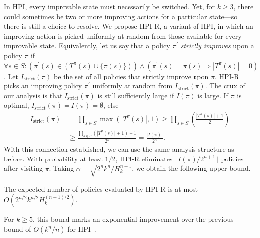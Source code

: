 In HPI, every improvable state must necessarily be switched. Yet, for $k \geq 3$, there could sometimes be two or more improving actions for a particular state---so there is still a choice to resolve. We propose HPI-R, a variant of HPI, in which an improving action is picked uniformly at random from those available for every improvable state. Equivalently, let us say that a policy $\pi^{\prime}$ \textit{strictly improves} upon a policy $\pi$ if $\forall s\in S: (\pi^{\prime}(s) \in (T^\pi(s) \cup \{\pi(s)\})) \wedge (\pi^{\prime}(s)=\pi(s)\Rightarrow |T^\pi(s)|=0)$. Let $I_{\text{strict}}(\pi)$ be the set of all policies that strictly improve upon $\pi$. HPI-R picks an improving policy $\pi^{\prime}$ uniformly at random from $I_{\text{strict}}(\pi)$. The crux of our analysis is that $I_{\text{strict}}(\pi)$ is still sufficiently large if $I(\pi)$ is large. If $\pi$ is optimal, $I_{\text{strict}}(\pi) = I(\pi) = \emptyset$, else
\begin{align*}
|I_{\text{strict}}(\pi)|
&= \prod_{s \in S} \max(|T^{\pi}(s)|, 1)
\geq
\prod_{s \in S} \left(\frac{|T^{\pi}(s)| + 1}{2}\right)\\
&\geq
\frac{\prod_{s \in S} (|T^{\pi}(s)| + 1) - 1}{2^{n}}
=  \frac{|I(\pi)|}{2^{n}}.
\end{align*}
With this connection established, we can use the same analysis structure as before. With probability at least $1/2$, HPI-R eliminates  $\lfloor I(\pi) / 2^{n + 1} \rfloor$ policies after visiting $\pi$. Taking $\alpha = \sqrt{2^{n}k^{n}/H_{k}^{n - 1}}$, we obtain the following upper bound.
\begin{theorem}
The expected number of policies evaluated by HPI-R is at most $O(2^{n/2}k^{n/2}H_{k}^{(n - 1)/2})$.
\end{theorem}
For $k \geq 5$, this bound marks an exponential improvement over the previous bound of $O(k^{n}/n)$ for HPI~\cite{Mansour+Singh:1999}. 



